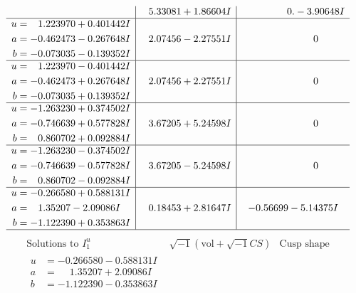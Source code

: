 \documentclass[1p]{elsarticle_modified}
\theoremstyle{definition}
\newcommand{\I}{\sqrt{-1}}
\begin{document}
$$\begin{array}{c|c|c}
 & \phantom{-}5.33081 + 1.86604 I & \phantom{-0.000000 } 0. - 3.90648 I \\ \hline\begin{aligned}
u &= \phantom{-}1.223970 + 0.401442 I \\
a &= -0.462473 - 0.267648 I \\
b &= -0.073035 - 0.139352 I\end{aligned}
 & \phantom{-}2.07456 - 2.27551 I & \phantom{-0.000000 } 0 \\ \hline\begin{aligned}
u &= \phantom{-}1.223970 - 0.401442 I \\
a &= -0.462473 + 0.267648 I \\
b &= -0.073035 + 0.139352 I\end{aligned}
 & \phantom{-}2.07456 + 2.27551 I & \phantom{-0.000000 } 0 \\ \hline\begin{aligned}
u &= -1.263230 + 0.374502 I \\
a &= -0.746639 + 0.577828 I \\
b &= \phantom{-}0.860702 + 0.092884 I\end{aligned}
 & \phantom{-}3.67205 + 5.24598 I & \phantom{-0.000000 } 0 \\ \hline\begin{aligned}
u &= -1.263230 - 0.374502 I \\
a &= -0.746639 - 0.577828 I \\
b &= \phantom{-}0.860702 - 0.092884 I\end{aligned}
 & \phantom{-}3.67205 - 5.24598 I & \phantom{-0.000000 } 0 \\ \hline\begin{aligned}
u &= -0.266580 + 0.588131 I \\
a &= \phantom{-}1.35207 - 2.09086 I \\
b &= -1.122390 + 0.353863 I\end{aligned}
 & \phantom{-}0.18453 + 2.81647 I & -0.56699 - 5.14375 I\\
 \hline 
 \end{array}$$\newpage$$\begin{array}{c|c|c}  
\text{Solutions to }I^u_{1}& \I (\text{vol} + \sqrt{-1}CS) & \text{Cusp shape}\\
 \hline 
\begin{aligned}
u &= -0.266580 - 0.588131 I \\
a &= \phantom{-}1.35207 + 2.09086 I \\
b &= -1.122390 - 0.353863 I\end{aligned}

\end{array}$$
\end{document}
